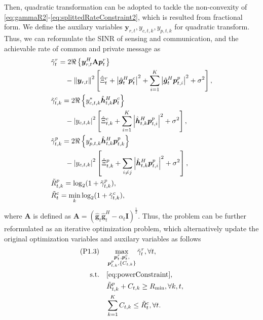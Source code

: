 \documentclass[twocolumn,journal]{IEEEtran}
\begin{document}
Then, quadratic transformation \cite{shenFractional2018a} can be adopted to tackle the non-convexity of \eqref{eq:gammaR2}-\eqref{eq:splittedRateConstraint2}, which is resulted from fractional form. We define the auxilary variables \(\boldsymbol{y}_{r,t},y_{c,t,k},y_{p,t,k}\) for quadratic transform. Thus, we can reformulate the SINR of sensing and communication, and the achievable rate of common and private message as
\begin{subequations}
\begin{align}
    &\tilde{\gamma}_{t}^{r}=2\Re\left\{\boldsymbol{y}_{r,t}^H\mathbf{A}\boldsymbol{p}^{r}_{t}\right\}\notag\\
    &\qquad-\left\Vert \boldsymbol{y}_{r,t}\right\Vert^2 \left[\hat{\Xi}^{r}_{t} + \left| \hat{\boldsymbol{g}}^{H}_{t}\boldsymbol{p}^{c}_{t}\right|^2 + \sum_{i=1}^{K}\left| \hat{\boldsymbol{g}}^{H}_{t}\boldsymbol{p}^{p}_{t,i}\right|^2 + \sigma^2\right],\\
    &\tilde{\gamma}_{t,k}^{c}=2\Re\left\{ y_{c,t,k}^{*}\hat{\boldsymbol{h}}^{H}_{t,k}\boldsymbol{p}^{c}_{t} \right\}\notag\\ 
    &\qquad- \left\vert y_{c,t,k} \right\vert^2\left[ \hat{\Xi}^{c}_{t,k} +  \sum_{i=1}^{K}\left| \hat{\boldsymbol{h}}^{H}_{t,k}\boldsymbol{p}^{p}_{t,i}\right|^2 + \sigma^2 \right],\\
    &\tilde{\gamma}_{t,k}^{p}=2\Re\left\{ y_{p,t,k}^{*}\hat{\boldsymbol{h}}^{H}_{t,k}\boldsymbol{p}^{p}_{t,k} \right\}\notag\\ 
    &\qquad- \left\vert y_{c,t,k} \right\vert^2\left[ \hat{\Xi}^{p}_{t,k} +  \sum_{i\neq j}\left| \hat{\boldsymbol{h}}^{H}_{t,k}\boldsymbol{p}^{p}_{t,i}\right|^2 + \sigma^2 \right],\\
    &\tilde{R}^{p}_{t,k} = \log_2(1+\tilde{\gamma}_{t,k}^{p}),\\
    &\tilde{R}^{c}_{t} =  \min_{k}\log_2(1+\tilde{\gamma}_{t,k}^{c}),
\end{align}
\end{subequations}
where \(\mathbf{A}\) is defined as \(\mathbf{A} = \left(\hat{\boldsymbol{g}}_{t}\hat{\boldsymbol{g}}^{H}_{t}-\alpha_t\mathbf{I}\right)^{\frac{1}{2}}\). Thus, the problem can be further reformulated as an iterative optimization problem, which alternatively update the original optimization variables and auxilary variables as follows
\begin{subequations}
\begin{align}
    (\text{P1.3})\quad&\mathop{\max}_{{\substack{\boldsymbol{p}^{r}_{t},\boldsymbol{p}^{c}_{t},\\
    \boldsymbol{p}^{p}_{t,k},\left\{C_{t,k}\right\}}}}\tilde{\gamma}_{t}^{r}, \forall t,\label{eq:gammaRQT}\\
    \text{s.t.}\quad&\eqref{eq:powerConstraint},\notag\\
    \quad&\tilde{R}^{p}_{t,k} + C_{t,k} \geq R_{\min}, \forall k,t,\label{eq:rateConstraintQT}\\
    & \sum_{k=1}^{K} C_{t,k} \leq \tilde{R}^{c}_{t}, \forall t. \label{eq:splittedRateConstraintQT}
\end{align}
\end{subequations}
\end{document}

